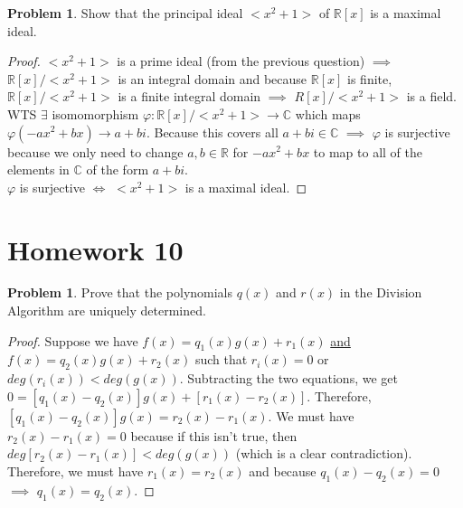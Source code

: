 \documentclass[11pt]{article}
\theoremstyle{definition}
\newtheorem{prob}[thm]{Problem}
\numberwithin{equation}{section}
\newcommand{\R}{\mathbb{R}}  %
\newcommand{\C}{\mathbb{C}}  %
\begin{document}
\begin{prob}
Show that the principal ideal $<x^{2}+1>$ of $\R[x]$ is a maximal ideal.
\end{prob}

\begin{proof}
$<x^{2}+1>$ is a prime ideal (from the previous question) $\implies$ $\R[x]/<x^{2}+1>$ is an integral domain and because $\R[x]$ is finite, $\R[x]/<x^{2}+1>$ is a finite integral domain $\implies$ $R[x]/<x^{2}+1>$ is a field. WTS $\exists$ isomomorphism $\varphi: \R[x]/<x^{2}+1> \rightarrow \C$ which maps $\varphi(-ax^{2}+bx) \rightarrow a+bi$. Because this covers all $a+bi \in \C$ $\implies$ $\varphi$ is surjective because we only need to change $a, b \in \R$ for $-ax^{2}+bx$ to map to all of the elements in $\C$ of the form $a+bi$.\\
$\varphi$ is surjective $\Longleftrightarrow$ $<x^{2}+1>$ is a maximal ideal.
\end{proof}

\section{Homework 10}

\begin{prob}
Prove that the polynomials $q(x)$ and $r(x)$ in the Division Algorithm are uniquely determined.
\end{prob}

\begin{proof}
Suppose we have $f(x) = q_{1}(x)g(x)+r_{1}(x)$ \underline{and} $f(x) = q_{2}(x)g(x)+r_{2}(x)$ such that $r_{i}(x) = 0$ or $deg(r_{i}(x)) < deg(g(x))$. Subtracting the two equations, we get $0 = [q_{1}(x)-q_{2}(x)]g(x)+[r_{1}(x)-r_{2}(x)]$. Therefore, $[q_{1}(x)-q_{2}(x)]g(x) = r_{2}(x) - r_{1}(x)$. We must have $r_{2}(x)-r_{1}(x) = 0$ because if this isn't true, then $deg[r_{2}(x)-r_{1}(x)] < deg(g(x))$ (which is a clear contradiction). Therefore, we must have $r_{1}(x) = r_{2}(x)$ and because $q_{1}(x)-q_{2}(x) = 0$ $\implies$ $q_{1}(x) = q_{2}(x)$.
\end{proof}
\end{document}

